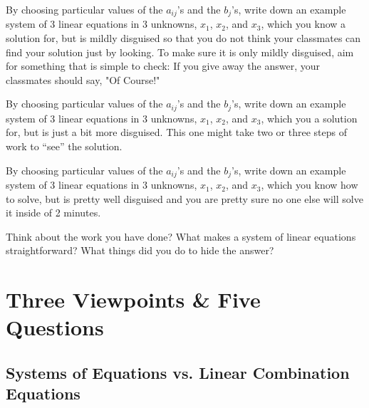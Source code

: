 \documentclass[cahier-main.tex]{subfiles}
\begin{document}
\clearpage

\begin{task}
By choosing particular values of the $a_{ij}$'s and the $b_j$'s,
write down an example system of $3$ linear equations in $3$ unknowns, $x_1$, $x_2$, and $x_3$, which you know a solution for, but is mildly disguised so that you do not think your classmates can find your solution just by looking. To make sure it is only mildly disguised, aim for something that is simple to check: If you give away the answer, your classmates should say, "Of Course!"
\end{task}

\begin{task}
By choosing particular values of the $a_{ij}$'s and the $b_j$'s,
write down an example system of $3$ linear equations in $3$ unknowns, $x_1$, $x_2$, and $x_3$, which you a solution for, but is just a bit more disguised. This one might take two or three steps of work to ``see'' the solution.
\end{task}

\begin{task}
By choosing particular values of the $a_{ij}$'s and the $b_j$'s,
write down an example system of $3$ linear equations in $3$ unknowns, $x_1$, $x_2$, and $x_3$, which you know how to solve, but is pretty well disguised and you are pretty sure no one else will solve it inside of 2 minutes.
\end{task}

\begin{task}
Think about the work you have done? What makes a system of linear equations straightforward? What things did you do to hide the answer?
\end{task}


\chapter{Three Viewpoints \& Five Questions}

\section{Systems of Equations vs. Linear Combination Equations}
\end{document}
